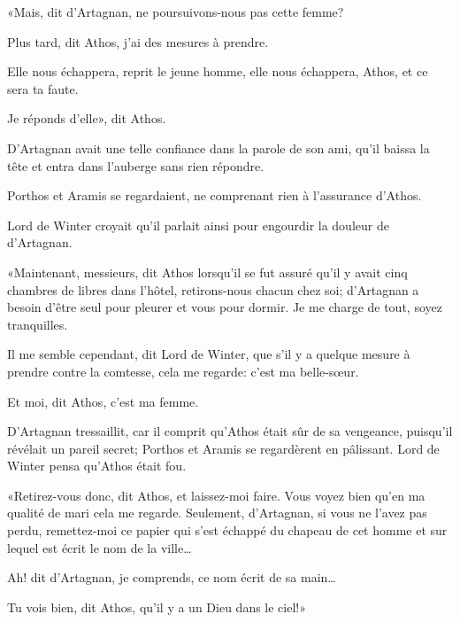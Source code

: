 «Mais, dit d'Artagnan, ne poursuivons-nous pas cette femme? 

\speak  Plus tard, dit Athos, j'ai des mesures à prendre. 

\speak  Elle nous échappera, reprit le jeune homme, elle nous échappera, Athos, et ce sera ta faute. 

\speak  Je réponds d'elle», dit Athos. 

D'Artagnan avait une telle confiance dans la parole de son ami, qu'il baissa la tête et entra dans l'auberge sans rien répondre. 

Porthos et Aramis se regardaient, ne comprenant rien à l'assurance d'Athos. 

Lord de Winter croyait qu'il parlait ainsi pour engourdir la douleur de d'Artagnan. 

«Maintenant, messieurs, dit Athos lorsqu'il se fut assuré qu'il y avait cinq chambres de libres dans l'hôtel, retirons-nous chacun chez soi; d'Artagnan a besoin d'être seul pour pleurer et vous pour dormir. Je me charge de tout, soyez tranquilles. 

\speak  Il me semble cependant, dit Lord de Winter, que s'il y a quelque mesure à prendre contre la comtesse, cela me regarde: c'est ma belle-sœur. 

\speak  Et moi, dit Athos, c'est ma femme. 

D'Artagnan tressaillit, car il comprit qu'Athos était sûr de sa vengeance, puisqu'il révélait un pareil secret; Porthos et Aramis se regardèrent en pâlissant. Lord de Winter pensa qu'Athos était fou. 

«Retirez-vous donc, dit Athos, et laissez-moi faire. Vous voyez bien qu'en ma qualité de mari cela me regarde. Seulement, d'Artagnan, si vous ne l'avez pas perdu, remettez-moi ce papier qui s'est échappé du chapeau de cet homme et sur lequel est écrit le nom de la ville\dots 

\speak  Ah! dit d'Artagnan, je comprends, ce nom écrit de sa main\dots 

\speak  Tu vois bien, dit Athos, qu'il y a un Dieu dans le ciel!» 
